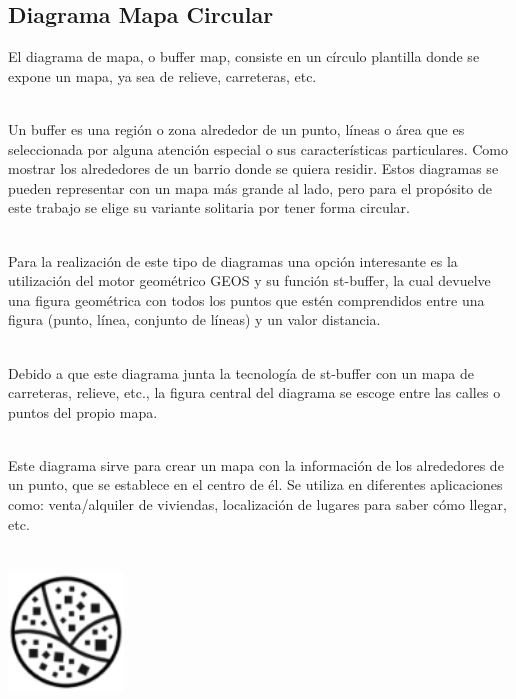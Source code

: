 \documentclass{article}\usepackage[]{graphicx}\usepackage[]{color}
\begin{document}
\subsection{Diagrama Mapa Circular}
El diagrama de mapa, o buffer map, consiste en un c\'irculo plantilla donde se expone un mapa, ya sea de relieve, carreteras, etc.~\\~\par
Un buffer es una regi\'on o zona alrededor de un punto, l\'ineas o \'area que es seleccionada por alguna atenci\'on especial o sus caracter\'isticas particulares. Como mostrar los alrededores de un barrio donde se quiera residir. Estos diagramas se pueden representar con un mapa m\'as grande al lado, pero para el prop\'osito de este trabajo se elige su variante solitaria por tener forma circular\cite{Info}.~\\~\par
Para la realizaci\'on de este tipo de diagramas una opci\'on interesante es la utilizaci\'on del motor geom\'etrico GEOS y su funci\'on st-buffer, la cual devuelve una figura geom\'etrica con todos los puntos que est\'en comprendidos entre una figura (punto, l\'inea, conjunto de l\'ineas) y un valor distancia\cite{st-buffer}.~\\~\par
Debido a que este diagrama junta la tecnolog\'ia de st-buffer con un mapa de carreteras, relieve, etc., la figura central del diagrama se escoge entre las calles o puntos del propio mapa.~\\~\par
Este diagrama sirve para crear un mapa con la informaci\'on de los alrededores de un punto, que se establece en el centro de \'el. Se utiliza en diferentes aplicaciones como: venta/alquiler de viviendas, localizaci\'on de lugares para saber c\'omo llegar, etc.
~\\~\\~\\
\vbox{
    \centering
    \includegraphics[width=0.23\textwidth]{imag/carreteras}
}
\end{document}
